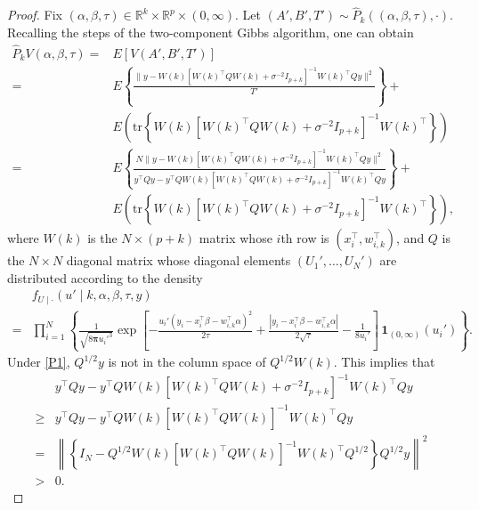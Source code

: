 \documentclass[12pt]{article}
\newcommand{\ind}{\mathbf{1}}
\begin{document}
	\begin{proof}
		Fix $(\alpha, \beta, \tau) \in \mathbb{R}^k \times \mathbb{R}^p \times (0,\infty)$.
		Let $(A',B',T') \sim \hat{P}_k((\alpha, \beta, \tau), \cdot)$.
		Recalling the steps of the two-component Gibbs algorithm, one can obtain
		\[
		\begin{aligned}
			\hat{P}_k V(\alpha, \beta, \tau) =& E \left[ V(A',B',T') \right] \\
			=& E\left\{ \frac{\|y - W(k) [W(k)^{\top} Q W(k) + \sigma^{-2} I_{p+k} ]^{-1} W(k)^{\top} Q y \|^2 }{T'} \right\} + \\
			& E \left( \mbox{tr} \left\{ W(k) [W(k)^{\top} Q W(k) + \sigma^{-2} I_{p+k} ]^{-1} W(k)^{\top} \right\} \right) \\
			=& E\left\{ \frac{N \| y -  W(k) [W(k)^{\top} Q W(k) + \sigma^{-2} I_{p+k} ]^{-1} W(k)^{\top} Q y \|^2 }{ y^{\top} Q y - y^{\top} Q W(k) [W(k)^{\top} Q W(k) + \sigma^{-2} I_{p+k}]^{-1} W(k)^{\top} Q y } \right\} + \\
			& E \left( \mbox{tr} \left\{ W(k) [W(k)^{\top} Q W(k) + \sigma^{-2} I_{p+k} ]^{-1} W(k)^{\top} \right\} \right),
		\end{aligned}
		\]
		where $W(k)$ is the $N \times (p+k)$ matrix whose $i$th row is $(x_i^{\top}, w_{i,k}^{\top})$, and $Q$ is the $N \times N$ diagonal matrix whose diagonal elements $(U_1',\dots, U_N')$ are distributed according to the density 
		\[
		\begin{aligned}
			&f_{U \mid \cdot}(u' \mid k, \alpha, \beta, \tau, y) \\
			=& \prod_{i=1}^N \left\{ \frac{1}{\sqrt{8\bm{\pi} u_i'^3}} \exp \left[ -  \frac{u_i' (y_i - x_i^{\top} \beta - w_{i,k}^{\top} \alpha )^2}{2\tau} + \frac{|y_i - x_i^{\top} \beta - w_{i,k}^{\top} \alpha|}{2\sqrt{\tau}}  - \frac{1}{8u_i'} \right]  \, \ind_{(0,\infty)}(u_i') \right\}.
		\end{aligned}
		\]
		Under \ref{P1}, $Q^{1/2} y$ is not in the column space of $Q^{1/2} W(k)$.
		This implies that
		\[
		\begin{aligned}
			& y^{\top} Q y - y^{\top} Q W(k) [W(k)^{\top} Q W(k) + \sigma^{-2} I_{p+k}]^{-1} W(k)^{\top} Q y \\
			\geq & y^{\top} Q y - y^{\top} Q W(k) [W(k)^{\top} Q W(k) ]^{-1} W(k)^{\top} Q y \\
			=& \left\| \left\{ I_N -  Q^{1/2} W(k) [W(k)^{\top} Q W(k)]^{-1} W(k)^{\top} Q^{1/2} \right\} Q^{1/2} y \right\|^2 \\
			>& 0.
		\end{aligned}
\]
\end{proof}
\end{document}
